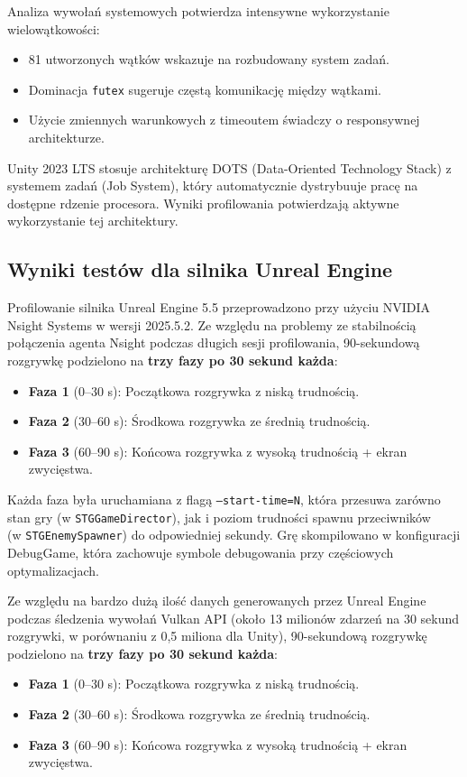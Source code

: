 Analiza wywołań systemowych potwierdza intensywne wykorzystanie wielowątkowości:
\begin{itemize}
    \item 81 utworzonych wątków wskazuje na rozbudowany system zadań.
    \item Dominacja \texttt{futex} sugeruje częstą komunikację między wątkami.
    \item Użycie zmiennych warunkowych z timeoutem świadczy o responsywnej architekturze.
\end{itemize}

Unity 2023 LTS stosuje architekturę DOTS (Data-Oriented Technology Stack) z systemem zadań (Job System), który automatycznie dystrybuuje pracę na 
dostępne rdzenie procesora. Wyniki profilowania potwierdzają aktywne wykorzystanie tej architektury.

\subsection{Wyniki testów dla silnika Unreal Engine}
\label{subsec:wyniki-unreal}

Profilowanie silnika Unreal Engine 5.5 przeprowadzono przy użyciu NVIDIA Nsight Systems w 
wersji 2025.5.2. Ze względu na problemy ze stabilnością 
połączenia agenta Nsight podczas długich sesji profilowania, 90-sekundową rozgrywkę 
podzielono na \textbf{trzy fazy po 30 sekund każda}:
\begin{itemize}
    \item \textbf{Faza 1} (0--30 s): Początkowa rozgrywka z niską trudnością.
    \item \textbf{Faza 2} (30--60 s): Środkowa rozgrywka ze średnią trudnością.
    \item \textbf{Faza 3} (60--90 s): Końcowa rozgrywka z wysoką trudnością + ekran zwycięstwa.
\end{itemize}

Każda faza była uruchamiana z flagą \texttt{--start-time=N}, która przesuwa 
zarówno stan gry 
(w \texttt{STGGameDirector}), jak i poziom trudności 
spawnu przeciwników \\ (w \texttt{STGEnemySpawner}) do odpowiedniej sekundy. Grę skompilowano w konfiguracji DebugGame, która zachowuje symbole 
debugowania przy częściowych optymalizacjach.


Ze względu na bardzo dużą ilość danych generowanych przez Unreal Engine podczas śledzenia wywołań Vulkan API (około 13 milionów zdarzeń
na 30 sekund rozgrywki, w porównaniu z 0,5 miliona dla Unity), 90-sekundową rozgrywkę podzielono na \textbf{trzy fazy po 30 sekund każda}:
\begin{itemize}
    \item \textbf{Faza 1} (0--30 s): Początkowa rozgrywka z niską trudnością.
    \item \textbf{Faza 2} (30--60 s): Środkowa rozgrywka ze średnią trudnością.
    \item \textbf{Faza 3} (60--90 s): Końcowa rozgrywka z wysoką trudnością + ekran zwycięstwa.
\end{itemize}

